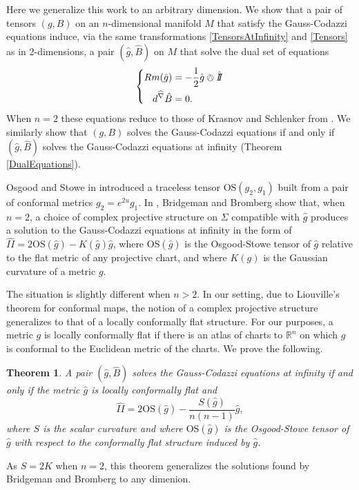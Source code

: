 \documentclass{amsart}
\newcommand{\R}{\mathbb{R}}
\newcommand{\two}{I\!\!I}
\newtheorem{bigthm}{Theorem}
\begin{document}
Here we generalize this work to an arbitrary dimension.
We show that a pair of tensors $(g,B)$ on an $n$-dimensional manifold $M$ that satisfy the Gauss-Codazzi equations induce, via the same transformations \eqref{TensorsAtInfinity} and \eqref{Tensors} as in 2-dimensions, a pair $(\hat{g},\hat{B})$ on $M$ that solve the dual set of equations
\[
\left\{
\begin{aligned}
Rm(\hat{g}) &= -\frac{1}{2}\hat{g} \owedge \hat{\two} \\
d^{\widehat{\nabla}}\hat{B} &= 0.
\end{aligned}
\right.
\]
When $n=2$ these equations reduce to those of Krasnov and Schlenker from \cite{Krasnov-Schlenker2008}. 
We similarly show that $(g,B)$ solves the Gauss-Codazzi equations if and only if $(\hat{g},\hat{B})$ solves the Gauss-Codazzi equations at infinity (Theorem \ref{DualEquations}).


Osgood and Stowe in \cite{Osgood-Stowe1992} introduced a traceless tensor $\mathrm{OS}(g_2,g_1)$ built from a pair of conformal metrics $g_2 = e^{2u}g_1$.
In \cite{Bridgeman-Bromberg2022}, Bridgeman and Bromberg show that, when $n = 2$, a choice of complex projective structure on $\Sigma$ compatible with $\hat{g}$ produces a solution to the Gauss-Codazzi equations at infinity in the form of $\hat{\two} = 2\mathrm{OS}(\hat{g}) - K(\hat{g})\hat{g}$, where $\mathrm{OS}(\hat{g})$ is the Osgood-Stowe tensor of $\hat{g}$ relative to the flat metric of any projective chart, and where $K(g)$ is the Gaussian curvature of a metric $g$.

The situation is slightly different when $n > 2$.
In our setting, due to Liouville's theorem for conformal maps, the notion of a complex projective structure generalizes to that of a locally conformally flat structure. 
For our purposes, a metric $g$ is locally conformally flat if there is an atlas of charts to $\R^n$ on which $g$ is conformal to the Euclidean metric of the charts.
We prove the following.

\begin{bigthm}
\label{bigthm1}
A pair $(\hat{g},\hat{B})$ solves the Gauss-Codazzi equations at infinity if and only if the metric $\hat{g}$ is locally conformally flat and
\[
\hat{\two} = 2\mathrm{OS}(\hat{g}) - \frac{S(\hat{g})}{n(n-1)}\hat{g},
\]
where $S$ is the scalar curvature and where $\mathrm{OS}(\hat{g})$ is the Osgood-Stowe tensor of $\hat{g}$ with respect to the conformally flat structure induced by $\hat{g}$.
\end{bigthm}
\noindent
As $S = 2K$ when $n=2$, this theorem generalizes the solutions found by Bridgeman and Bromberg to any dimenion.
\end{document}
